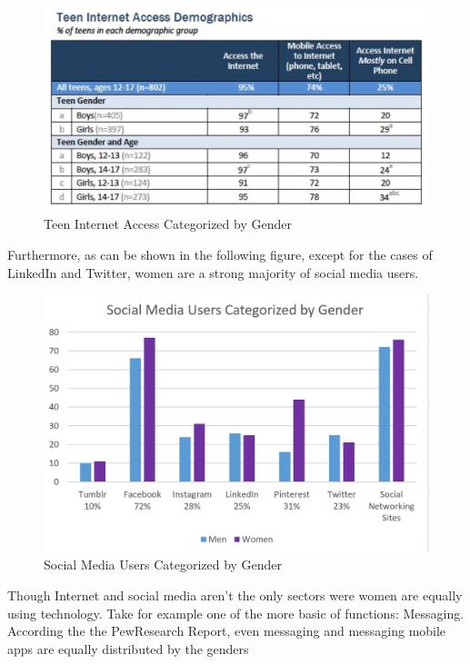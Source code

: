 \documentclass[12pt]{article}
\begin{document}
		\begin{figure}[H]
			\begin{center}
				\includegraphics[]{StatsInternet2.JPG}
				\caption{Teen Internet Access Categorized by Gender}		
			\end{center}
		\end{figure}
	
	Furthermore, as can be shown in the following figure, except for the cases of LinkedIn and Twitter, women are a strong majority of social media users.\\
	
	\begin{figure}[H]
		\begin{center}
			\includegraphics[]{SocialMediaStats}
			\caption{Social Media Users Categorized by Gender}
		\end{center}
	\end{figure}
	
	Though Internet and social media aren't the only sectors were women are equally using technology. Take for example one of the more basic of functions: Messaging. According the the PewResearch Report, even messaging and messaging mobile apps are equally distributed by the genders\\
	
\end{document}
